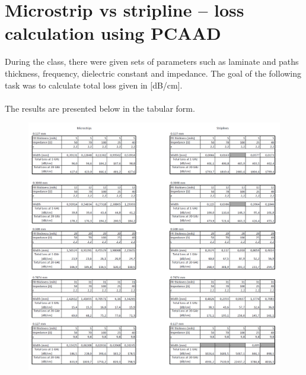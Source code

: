 \documentclass[a4paper, 11pt]{report}
\begin{document}
\newpage
\section{Microstrip vs stripline -- loss calculation using PCAAD}
During the class, there were given sets of parameters such as laminate and paths thickness, frequency, dielectric constant and impedance. The goal of the following task was to calculate total loss given in [dB/cm].\\
\\
The results are presented below in the tabular form.
\begin{figure}[h]
	\centering
	\includegraphics[width=1\linewidth]{microm1}
	\label{fig:microm1}
\end{figure}
\end{document}
